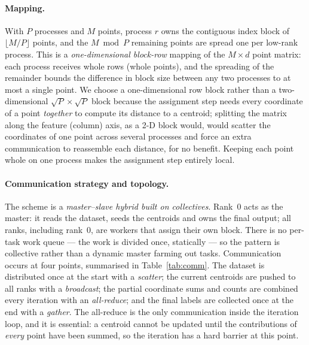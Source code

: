 \documentclass[11pt,a4paper]{article}
\begin{document}
\paragraph{Mapping.}
With $P$ processes and $M$ points, process $r$ owns the contiguous index block of
$\lfloor M/P\rfloor$ points, and the $M \bmod P$ remaining points are spread one
per low-rank process. This is a \emph{one-dimensional block-row} mapping of the
$M\times d$ point matrix: each process receives whole rows (whole points), and
the spreading of the remainder bounds the difference in block size between any
two processes to at most a single point. We choose a one-dimensional row block
rather than a two-dimensional $\sqrt{P}\times\sqrt{P}$ block because the
assignment step needs every coordinate of a point \emph{together} to compute its
distance to a centroid; splitting the matrix along the feature (column) axis, as
a 2-D block would, would scatter the coordinates of one point across several
processes and force an extra communication to reassemble each distance, for no
benefit. Keeping each point whole on one process makes the assignment step
entirely local.

\paragraph{Communication strategy and topology.}
The scheme is a \emph{master--slave hybrid built on collectives}. Rank~0 acts as
the master: it reads the dataset, seeds the centroids and owns the final output;
all ranks, including rank~0, are workers that assign their own block. There is no
per-task work queue --- the work is divided once, statically --- so the pattern is
collective rather than a dynamic master farming out tasks. Communication occurs
at four points, summarised in Table~\ref{tab:comm}. The dataset is distributed
once at the start with a \emph{scatter}; the current centroids are pushed to all
ranks with a \emph{broadcast}; the partial coordinate sums and counts are
combined every iteration with an \emph{all-reduce}; and the final labels are
collected once at the end with a \emph{gather}. The all-reduce is the only
communication inside the iteration loop, and it is essential: a centroid cannot
be updated until the contributions of \emph{every} point have been summed, so the
iteration has a hard barrier at this point.
\end{document}
